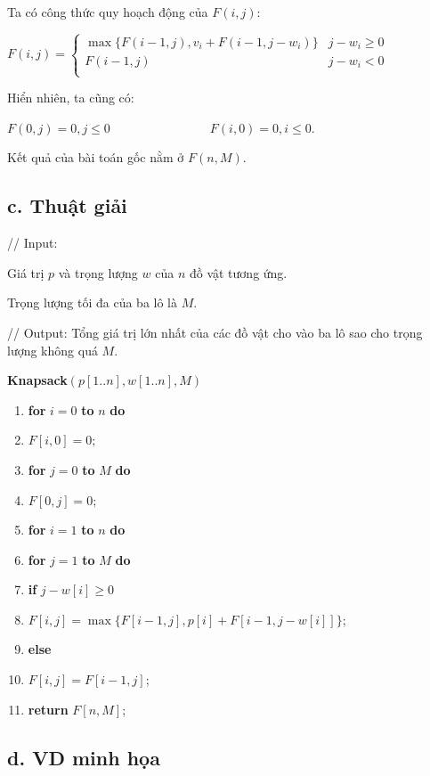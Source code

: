 \documentclass[12pt, a4paper, fleqn]{article}
\begin{document}
	Ta có công thức quy hoạch động của $F(i, j)$:
	
	$F(i, j) = {
		\begin{cases}
		\max\{F(i - 1, j), v_i + F(i - 1, j - w_i)\} & {j - w_i \geq 0} \\
		F(i - 1, j) & {j - w_i < 0} \\
		\end{cases}
	}$
	
	Hiển nhiên, ta cũng có:
	
	$F(0, j) = 0, j \leq 0 \qquad \qquad \qquad \qquad F(i, 0) = 0, i \leq 0$.
	
	Kết quả của bài toán gốc nằm ở $F(n, M)$.
	
	\subsection*{c. Thuật giải}
	
	// Input:
	
	Giá trị $p$ và trọng lượng $w$ của $n$ đồ vật tương ứng.
	
	Trọng lượng tối đa của ba lô là $M$.
	
	// Output: Tổng giá trị lớn nhất của các đồ vật cho vào ba lô sao cho trọng lượng không quá $M$.
	
	\textbf{Knapsack}$(p[1..n], w[1..n], M)$
	\begin{enumerate}
		\item \textbf{for} $i = 0$ \textbf{to} $n$ \textbf{do}
		\item \qquad $F[i, 0] = 0$;
		\item \textbf{for} $j = 0$ \textbf{to} $M$ \textbf{do}
		\item \qquad $F[0, j] = 0$;
		\item \textbf{for} $i = 1$ \textbf{to} $n$ \textbf{do}
		\item \qquad \textbf{for} $j = 1$ \textbf{to} $M$ \textbf{do}
		\item \qquad \qquad \textbf{if} $j - w[i] \geq 0$
		\item \qquad \qquad \qquad $F[i, j] = \max\{F[i - 1, j], p[i] + F[i - 1, j - w[i]]\}$;
		\item \qquad \qquad \textbf{else}
		\item \qquad \qquad \qquad $F[i, j] = F[i - 1, j]$;
		\item \textbf{return} $F[n, M]$;
	\end{enumerate}

	\subsection*{d. VD minh họa}
\end{document}
